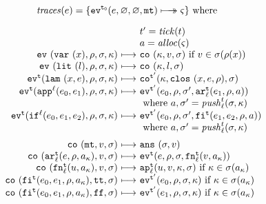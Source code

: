\documentclass[preprint,onecolumn,9pt]{sigplanconf} %
\begin{document}
\begin{figure}
\begin{gather*}
\begin{align*}
\traces(\mexp) &= \{ \ev[^{\mtcntr}]{\mexp,\varnothing,\varnothing,\kmt} \multimachstep \mstate \} \text{ where }
\end{align*}
\\[2mm]
\begin{array}{@{}r@{\ }c@{\ }l@{}}
&&\mcntr' =\tick(\mcntr) \\
&&\maddr  =\alloc(\mstate) \\
\ev{\svar\mvar,\menv,\msto,\mkont} &\machstep&
\co{\mkont,\mval,\msto}
\text{ if }\mval \in \msto(\menv(\mvar))
\\
\ev{\slit\mlit,\menv,\msto,\mkont} &\machstep&
\co{\mkont,\mlit,\msto}
\\
\ev[^\mcntr]{\slam\mvar\mexp,\menv,\msto,\mkont} &\machstep&
\co[^{\mcntr'}]{\mkont,\clos{\mvar,\mexp,\menv},\msto}
\\
\ev[^\mcntr]{\sapp[^\mlab]{\mexpi0}{\mexpi1},\menv,\msto,\mkont} &\machstep&
\ev[^{\mcntr'}]{\mexpi{0},\menv,\msto',\kar[_\mlab^\mcntr]{\mexpi{1},\menv,\maddr}}
\\
&&
\text{ where }\maddr,\msto' = \mathit{push}^\mcntr_\mlab(\msto,\mkont)
\\
\ev[^\mcntr]{\sif[^\mlab]{\mexpi0}{\mexpi1}{\mexpi2},\menv,\msto,\mkont} &\machstep&
\ev[^{\mcntr'}]{\mexpi0,\menv,\msto',\kif[^\mcntr]{\mexpi1,\mexpi2,\menv,\maddr}}
\\
&&
\text{ where }\maddr,\msto' = \mathit{push}_\mlab^\mcntr(\msto,\mkont)
\\[2mm]
\co{\kmt,\mval,\msto} &\machstep&
\ans{\msto,\mval}
\\
\co{\kar[^\mcntr_\mlab]{\mexp,\menv,\maddr_\mkont},\mval,\msto} & \machstep&
\ev[^\mcntr]{\mexp,\menv,\msto,\kfn[^\mcntr_\mlab]{\mval,\maddr_\mkont}}
\\
\co{\kfn[^\mcntr_\mlab]{{\mvalx{u}},\maddr_\mkont},\mval,\msto} & \machstep&
\ap[^\mcntr_\mlab]{\mvalx{u},\mval,\mkont,\msto}
\text{ if }\mkont \in \msto(\maddr_\mkont)
\\
\co{\kif[^\mcntr]{\mexpi0,\mexpi1,\menv,\maddr_\mkont},\strue,\msto} & \machstep&
\ev[^{\mcntr'}]{\mexpi0,\menv,\msto,\mkont}
\text{ if }\mkont\in\msto(\maddr_\mkont)
\\
\co{\kif[^\mcntr]{\mexpi0,\mexpi1,\menv,\maddr_\mkont},\sfalse,\msto} & \machstep&
\ev[^{\mcntr'}]{\mexpi1,\menv,\msto,\mkont}
\text{ if }\mkont\in\msto(\maddr_\mkont)
\\[2mm]

\end{array}
\end{gather*}
\end{figure}
\end{document}
